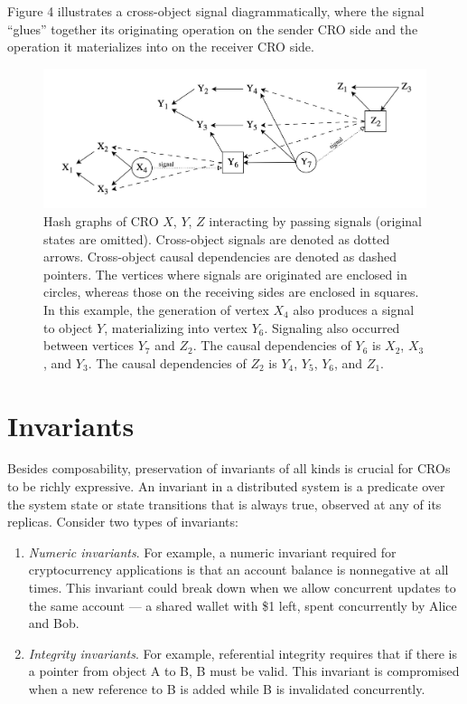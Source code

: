\documentclass{article}
\begin{document}
Figure 4 illustrates a cross-object signal diagrammatically, where the signal “glues” together its originating operation on the sender CRO side and the operation it materializes into on the receiver CRO side.

\begin{figure}[htp]
    \centering
    \includegraphics[width=15cm]{fig4}
    \caption{Hash graphs of CRO $X$, $Y$, $Z$ interacting by passing signals (original states are omitted). Cross-object signals are denoted as dotted arrows. Cross-object causal dependencies are denoted as dashed pointers. The vertices where signals are originated are enclosed in circles, whereas those on the receiving sides are enclosed in squares. In this example, the generation of vertex $X_4$ also produces a signal to object $Y$, materializing into vertex $Y_6$. Signaling also occurred between vertices $Y_7$ and $Z_2$. The causal dependencies of $Y_6$ is $X_2$, $X_3$, and $Y_3$. The causal dependencies of $Z_2$ is $Y_4$, $Y_5$, $Y_6$, and $Z_1$.}
    \label{fig:4}
\end{figure}

\section{Invariants}
\label{sec:headings}

Besides composability, preservation of invariants of all kinds is crucial for CROs to be richly expressive. An invariant in a distributed system is a predicate over the system state or state transitions that is always true, observed at any of its replicas. Consider two types of invariants:
\begin{enumerate}
    \item \textit{Numeric invariants}. For example, a numeric invariant required for cryptocurrency applications is that an account balance is nonnegative at all times. This invariant could break down when we allow concurrent updates to the same account — a shared wallet with \$1 left, spent concurrently by Alice and Bob.
    \item \textit{Integrity invariants}. For example, referential integrity requires that if there is a pointer from object A to B, B must be valid. This invariant is compromised when a new reference to B is added while B is invalidated concurrently.
\end{enumerate}
\end{document}
